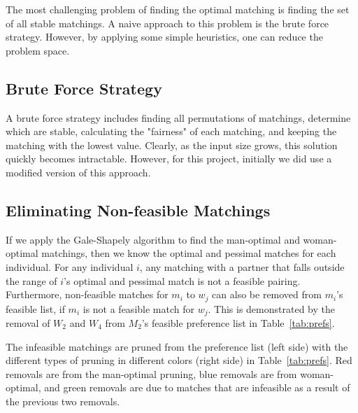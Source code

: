 \documentclass[a4paper]{article}
\begin{document}
The most challenging problem of finding the optimal matching is finding the set of all stable matchings. A naive approach to this problem is the brute force strategy. However, by applying some simple heuristics, one can reduce the problem space.

\subsection{Brute Force Strategy}

A brute force strategy includes finding all permutations of matchings, determine which are stable, calculating the "fairness" of each matching, and keeping the matching with the lowest value. Clearly, as the input size grows, this solution quickly becomes intractable. However, for this project, initially we did use a modified version of this approach.

\subsection{Eliminating Non-feasible Matchings}
If we apply the Gale-Shapely algorithm to find the man-optimal and woman-optimal matchings, then we know the optimal and pessimal matches for each individual. For any individual $i$, any matching with a partner that falls outside the range of $i$'s optimal and pessimal match is not a feasible pairing.  Furthermore, non-feasible matches for $m_i$ to $w_j$ can also be removed from $m_i$'s feasible list, if $m_i$ is not a feasible match for $w_j$.  This is demonstrated by the removal of $W_2$ and $W_4$ from $M_2$'s feasible preference list in Table~\ref{tab:prefs}.


The infeasible matchings are pruned from the preference list (left side) with the different types of pruning in different colors (right side) in Table~\ref{tab:prefs}.  
Red removals are from the man-optimal pruning, blue removals are from woman-optimal, and green removals are due to matches that are infeasible as a result of the previous two removals.

\newcommand\redsout{\bgroup\markoverwith{\textcolor{red}{\rule[0.5ex]{2pt}{1.8pt}}}\ULon}
\newcommand\bluesout{\bgroup\markoverwith{\textcolor{blue}{\rule[0.5ex]{2pt}{1.8pt}}}\ULon}
\newcommand\gresout{\bgroup\markoverwith{\textcolor{green}{\rule[0.5ex]{2pt}{1.8pt}}}\ULon}
\end{document}
